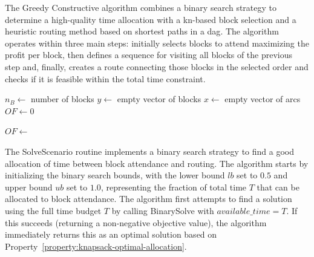 The Greedy Constructive algorithm combines a binary search strategy to determine a high-quality time allocation with a \gls{kn}-based block selection and a heuristic routing method based on shortest paths in a \gls{dag}. The algorithm operates within three main steps: initially selects blocks to attend maximizing the profit per block, then defines a sequence for visiting all blocks of the previous step and, finally, creates a route connecting those blocks in the selected order and checks if it is feasible within the total time constraint.

\begin{algorithm}[h!]
	\caption{Greedy Constructive Algorithm} \label{alg:greedy-constructive-algorithm}
	\SetAlgoLined

	$n_B \leftarrow$ number of blocks\;
	$y \leftarrow$ empty vector of blocks\;
	$x \leftarrow$ empty vector of arcs\;
	$OF \leftarrow 0$\;


	$OF \leftarrow$ \;

	\;
\end{algorithm}

The SolveScenario routine implements a binary search strategy to find a good allocation of time between block attendance and routing. The algorithm starts by initializing the binary search bounds, with the lower bound $lb$ set to $0.5$ and upper bound $ub$ set to $1.0$, representing the fraction of total time $T$ that can be allocated to block attendance. The algorithm first attempts to find a solution using the full time budget $T$ by calling BinarySolve with $available\_time = T$. If this succeeds (returning a non-negative objective value), the algorithm immediately returns this as an optimal solution based on Property~\ref{property:knapsack-optimal-allocation}.

